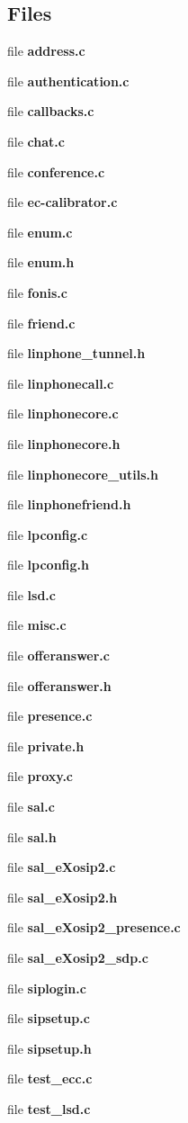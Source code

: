 \subsection*{\-Files}
\begin{DoxyCompactItemize}
\item 
file {\bfseries address.\-c}
\item 
file {\bfseries authentication.\-c}
\item 
file {\bfseries callbacks.\-c}
\item 
file {\bfseries chat.\-c}
\item 
file {\bfseries conference.\-c}
\item 
file {\bfseries ec-\/calibrator.\-c}
\item 
file {\bfseries enum.\-c}
\item 
file {\bfseries enum.\-h}
\item 
file {\bfseries fonis.\-c}
\item 
file {\bfseries friend.\-c}
\item 
file {\bfseries linphone\-\_\-tunnel.\-h}
\item 
file {\bfseries linphonecall.\-c}
\item 
file {\bfseries linphonecore.\-c}
\item 
file {\bfseries linphonecore.\-h}
\item 
file {\bfseries linphonecore\-\_\-utils.\-h}
\item 
file {\bfseries linphonefriend.\-h}
\item 
file {\bfseries lpconfig.\-c}
\item 
file {\bfseries lpconfig.\-h}
\item 
file {\bfseries lsd.\-c}
\item 
file {\bfseries misc.\-c}
\item 
file {\bfseries offeranswer.\-c}
\item 
file {\bfseries offeranswer.\-h}
\item 
file {\bfseries presence.\-c}
\item 
file {\bfseries private.\-h}
\item 
file {\bfseries proxy.\-c}
\item 
file {\bfseries sal.\-c}
\item 
file {\bfseries sal.\-h}
\item 
file {\bfseries sal\-\_\-e\-Xosip2.\-c}
\item 
file {\bfseries sal\-\_\-e\-Xosip2.\-h}
\item 
file {\bfseries sal\-\_\-e\-Xosip2\-\_\-presence.\-c}
\item 
file {\bfseries sal\-\_\-e\-Xosip2\-\_\-sdp.\-c}
\item 
file {\bfseries siplogin.\-c}
\item 
file {\bfseries sipsetup.\-c}
\item 
file {\bfseries sipsetup.\-h}
\item 
file {\bfseries test\-\_\-ecc.\-c}
\item 
file {\bfseries test\-\_\-lsd.\-c}
\end{DoxyCompactItemize}
